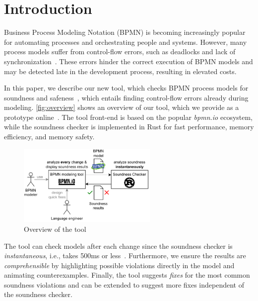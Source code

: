 \documentclass[runningheads]{llncs}
\begin{document}
\renewcommand{\labelenumi}{(\textbf{\arabic{enumi})}}

\section{Introduction} \label{sec:introduction}


Business Process Modeling Notation (BPMN) is becoming increasingly popular for automating processes and orchestrating people and systems.
However, many process models suffer from control-flow errors, such as deadlocks and lack of synchronization~\cite{fahlandAnalysisDemandInstantaneous2011}.
These errors hinder the correct execution of BPMN models and may be detected late in the development process, resulting in elevated costs.

In this paper, we describe our new tool, which checks BPMN process models for soundness and safeness~\cite{corradiniClassificationBPMNCollaborations2018}, which entails finding control-flow errors already during modeling.
\autoref{fig:overview} shows an overview of our tool, which we provide as a prototype online~\cite{noauthorgivenBPM2024Artifacts2024}.
The tool front-end is based on the popular \textit{bpmn.io} ecosystem, while the soundness checker is implemented in Rust for fast performance, memory efficiency, and memory safety.

\begin{figure}[ht]
	\centering
	\includegraphics[width=0.6\textwidth]{images/overview}
	\caption{Overview of the tool}
	\label{fig:overview}
\end{figure}

The tool can check models after each change since the soundness checker is \textit{instantaneous}, i.e., takes 500ms or less~\cite{fahlandAnalysisDemandInstantaneous2011}.
Furthermore, we ensure the results are \textit{comprehensible} by highlighting possible violations directly in the model and animating counterexamples.
Finally, the tool suggests \textit{fixes} for the most common soundness violations and can be extended to suggest more fixes independent of the soundness checker.
\end{document}
